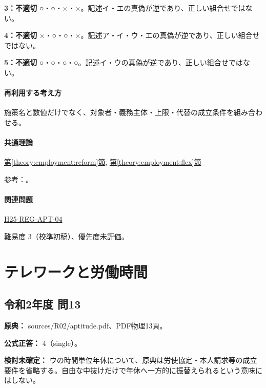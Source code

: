 \noindent\textbf{3：不適切} ○・○・×・×。記述イ・エの真偽が逆であり、正しい組合せではない。\par

\noindent\textbf{4：不適切} ×・○・○・×。記述ア・イ・ウ・エの真偽が逆であり、正しい組合せではない。\par

\noindent\textbf{5：不適切} ○・○・○・○。記述イ・ウの真偽が逆であり、正しい組合せではない。\par

\paragraph{再利用する考え方} 施策名と数値だけでなく、対象者・義務主体・上限・代替の成立条件を組み合わせる。

\paragraph{共通理論} \hyperref[theory:employment:reform]{第\ref*{theory:employment:reform}節}, \hyperref[theory:employment:flex]{第\ref*{theory:employment:flex}節}

\par 参考：\cite{employment_reform2018,employment_paidleave,employment_alternative2008}。

\paragraph{関連問題} \hyperref[q:h25-reg-apt-04]{H25-REG-APT-04}

\par 難易度 3（校準初稿）、優先度未評価。

\section{テレワークと労働時間}

\subsection{令和2年度 問13}
\label{q:r02-reg-apt-13}

\noindent\textbf{原典：} sources/R02/aptitude.pdf、PDF物理13頁。

\textbf{公式正答：} 4（single）。

\par\textbf{検討未確定：} ウの時間単位年休について、原典は労使協定・本人請求等の成立要件を省略する。自由な中抜けだけで年休へ一方的に振替えられるという意味にはしない。

